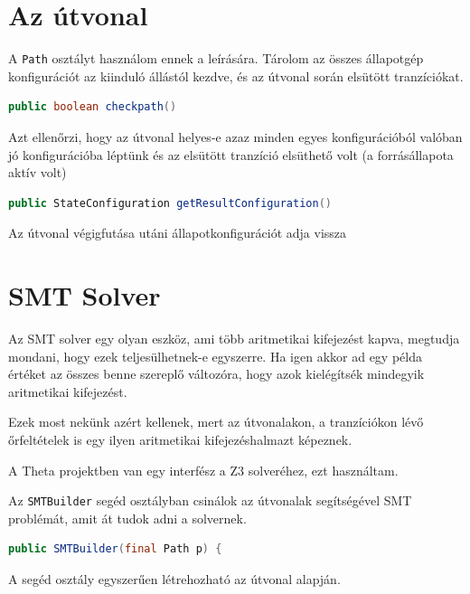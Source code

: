 \section{Az útvonal}
A \verb+Path+ osztályt használom ennek a leírására. Tárolom az összes állapotgép konfigurációt az kiinduló állástól kezdve, és az útvonal során elsütött tranzíciókat.


\begin{lstlisting}[language=java,breaklines=true]
public boolean checkpath()
\end{lstlisting}

Azt ellenőrzi, hogy az útvonal helyes-e azaz minden egyes konfigurációból valóban jó konfigurációba léptünk és az elsütött tranzíció elsüthető volt (a forrásállapota aktív volt)

\begin{lstlisting}[language=java,breaklines=true]
public StateConfiguration getResultConfiguration()
\end{lstlisting}

Az útvonal végigfutása utáni állapotkonfigurációt adja vissza


\section{SMT Solver}
Az SMT solver egy olyan eszköz, ami több aritmetikai kifejezést kapva, megtudja mondani, hogy ezek teljesülhetnek-e egyszerre. Ha igen akkor ad egy példa értéket az összes benne szereplő változóra, hogy azok kielégítsék mindegyik aritmetikai kifejezést.

Ezek most nekünk azért kellenek, mert az útvonalakon, a tranzíciókon lévő őrfeltételek is egy ilyen aritmetikai kifejezéshalmazt képeznek. 

A Theta projektben van egy interfész a Z3 solveréhez, ezt használtam.

Az \verb+SMTBuilder+ segéd osztályban csinálok az útvonalak segítségével SMT problémát, amit át tudok adni a solvernek.

\begin{lstlisting}[language=java,breaklines=true]
public SMTBuilder(final Path p) {
\end{lstlisting}
A segéd osztály egyszerűen létrehozható az útvonal alapján.



